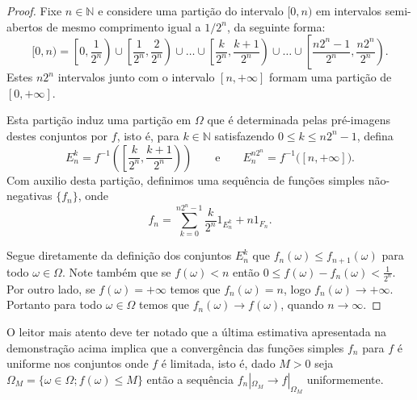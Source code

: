 \begin{proof} 
Fixe $n\in\mathbb{N}$ e considere uma partição do 
intervalo $[0,n)$ em intervalos semi-abertos de
mesmo comprimento igual a $1/2^n$, da seguinte 
forma:
\[
[0,n)
=
\left[ 0,\frac{1}{2^n} \right) 
\cup
\left[ \frac{1}{2^n},\frac{2}{2^n} \right) 
\cup
\ldots
\cup 
\left[ \frac{k}{2^n},\frac{k+1}{2^n} \right) 
\cup
\ldots
\cup
\left[ \frac{n2^n-1}{2^n}, \frac{n2^n}{2^n} \right).
\]
Estes $n2^n$ intervalos 
junto com o intervalo $[n,+\infty]$ formam uma partição 
de $[0,+\infty]$. 

Esta partição induz uma partição em $\Omega$
que é determinada pelas pré-imagens destes conjuntos 
por $f$, isto é, para $k\in\mathbb{N}$ satisfazendo 
$0\leq k\leq n2^{n}-1$, defina
\[
E_{n}^{k}=
f^{-1}\left( \left[\frac{k}{2^n},\frac{k+1}{2^n} \right) \right)
\qquad \text{e} \qquad
E_n^{n2^n}=f^{-1}\big( [n,+\infty]\big).
\]
Com auxilio desta partição, 
definimos uma sequência de funções simples
não-negativas $\{f_n\}$, onde 
\[
f_n =\sum_{k=0}^{n2^n-1} \frac{k}{2^n} 1_{E_{n}^{k}} + n 1_{F_n}.
\]

Segue diretamente da definição dos conjuntos 
$E_{n}^{k}$ que $f_n(\omega)\leq f_{n+1}(\omega)$ 
para todo $\omega\in\Omega$.
Note também que se $f(\omega)<n$ 
então $0\leq f(\omega)-f_n(\omega)<\frac{1}{2^n}$. 
Por outro lado, se 
$f(\omega)=+\infty$ temos que $f_n(\omega)= n$,
logo $f_n(\omega)\to+\infty$.
Portanto para todo $\omega\in\Omega$ temos que 
$f_n(\omega)\to f(\omega)$, quando $n\to\infty$.
\end{proof}

\begin{observacao} 
O leitor mais atento deve ter notado que 
a última estimativa apresentada na demonstração acima 
implica que a convergência das funções simples $f_n$ 
para $f$ é uniforme nos conjuntos 
onde $f$ é limitada, isto é, dado $M>0$ 
seja $\Omega_M=\{\omega\in\Omega; f(\omega)\leq M\}$ então a sequência 
$f_n|_{\Omega_M}\to f|_{\Omega_M}$ uniformemente.
\end{observacao}

 














